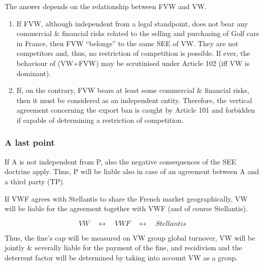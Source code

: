             The answer depends on the relationship between FVW and VW.
            \begin{enumerate}[label=\alph*.]
                \item If FVW, although independent from a legal standpoint, does not bear any commercial \& financial risks related to the selling and purchasing of Golf cars in France, then FVW ``belongs'' to the same SEE of VW. They are not competitors and, thus, no restriction of competition is possible. If ever, the behaviour of (VW+FVW) may be scrutinised under Article 102 (iff VW is dominant).
                
                \item If, on the contrary, FVW bears at least some commercial \& financial risks, then it must be considered as an independent entity. Therefore, the vertical agreement concerning the export ban is caught by Article 101 and forbidden if capable of determining a restriction of competition.
            \end{enumerate}

        \subsubsection{A last point}

            If A is not independent from P, also the negative consequences of the SEE doctrine apply. Thus, P will be liable also in case of an agreement between A and a third party (TP).

            If VWF agrees with Stellantis to share the French market geographically, VW will be liable for the agreement together with VWF (and of course Stellantis).
            
            \[
            VW \quad \longleftrightarrow \quad VWF \quad \longleftrightarrow \quad Stellantis
            \]
            
            Thus, the fine’s cap will be measured on VW group global turnover, VW will be jointly \& severally liable for the payment of the fine, and recidivism and the deterrent factor will be determined by taking into account VW as a group.
            